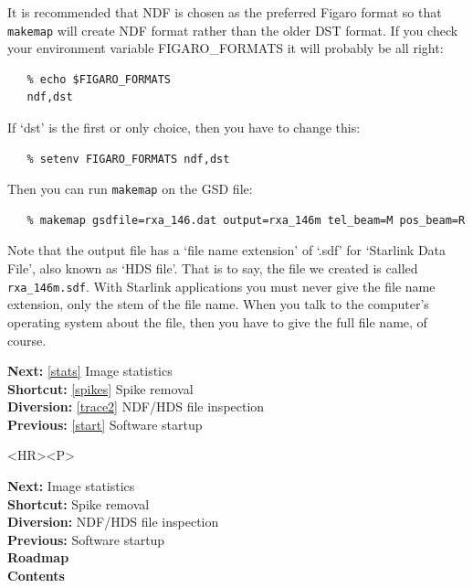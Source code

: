 \documentclass[11pt]{article}
\newenvironment{latexonly}{}{}
\newcommand{\htmlref}[2]{#1}
\begin{document}
   It is recommended that NDF is chosen as the preferred Figaro format
   so that {\tt makemap} will create NDF format rather than the older
\htmlref{DST format.}{glossdst}
   If you check your
   environment variable FIGARO\_FORMATS it will probably be all right:

\begin{verbatim}
   % echo $FIGARO_FORMATS
   ndf,dst
\end{verbatim}

   If `dst' is the first or only choice, then you have to change this:

\begin{verbatim}
   % setenv FIGARO_FORMATS ndf,dst
\end{verbatim}

   Then you can run {\tt makemap} on the GSD file:

\begin{verbatim}
   % makemap gsdfile=rxa_146.dat output=rxa_146m tel_beam=M pos_beam=R
\end{verbatim}

   Note that the output file has a `file name extension' of `.sdf' for
\htmlref{`Starlink Data File',}{glosssdf}
   also known as
\htmlref{`HDS file'.}{glosshds}
   That is to say, the file we created is called {\tt rxa\_146m.sdf}.
   With Starlink applications you must never give the file name
   extension, only the stem of the file name. When you talk to the
   computer's operating system about the file, then you have to give the
   full file name, of course.

\begin{latexonly}
{\bf Next:} \ref{stats} Image statistics\\
{\bf Shortcut:} \ref{spikes} Spike removal\\
{\bf Diversion:} \ref{trace2} NDF/HDS file inspection\\
{\bf Previous:} \ref{start} Software startup\\
\end{latexonly}

\begin{htmlonly}
\begin{rawhtml} <HR><P> \end{rawhtml}
{\bf \htmlref{Next:}{stats}} Image statistics\\
{\bf \htmlref{Shortcut:}{spikes}} Spike removal\\
{\bf \htmlref{Diversion:}{trace2}} NDF/HDS file inspection\\
{\bf \htmlref{Previous:}{start}} Software startup\\
{\bf \htmlref{Roadmap}{roadmap}}\\
{\bf \htmlref{Contents}{stardoccontents}}\\
\end{htmlonly}
\end{document}
